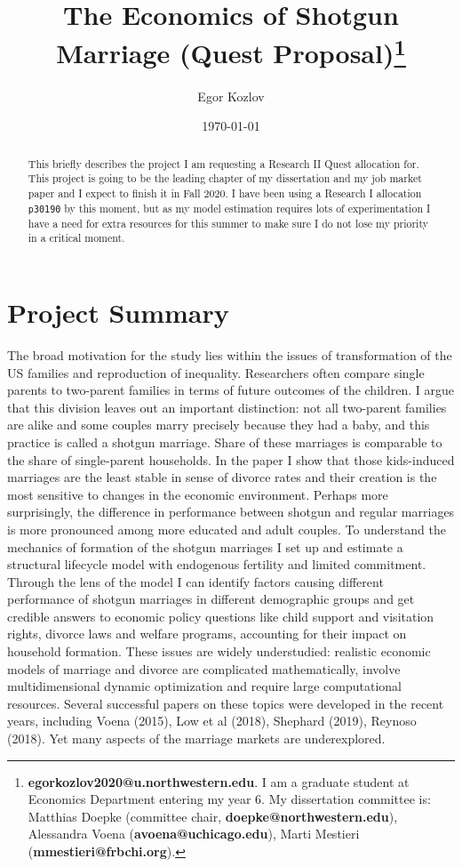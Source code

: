 \documentclass[11pt,letter]{article}
\begin{document}
\title{The Economics of Shotgun Marriage (Quest Proposal)\footnote{\textbf{egorkozlov2020@u.northwestern.edu}. I am a graduate student at Economics Department entering my year 6. My dissertation committee is: Matthias Doepke (committee chair, \textbf{doepke@northwestern.edu}), Alessandra Voena (\textbf{avoena@uchicago.edu}), Marti Mestieri (\textbf{mmestieri@frbchi.org}).}}
\author{Egor Kozlov}
\date{\today}
\maketitle



\begin{abstract}
This briefly describes the project I am requesting a Research II Quest allocation for. This project is going to be the leading chapter of my dissertation and my job market paper and I expect to finish it in Fall 2020. I have been using a Research I allocation \verb'p30190' by this moment, but as my model estimation requires lots of experimentation I have a need for extra resources for this summer to make sure I do not lose my priority in a critical moment.
\end{abstract}

\section{Project Summary}

The broad motivation for the study lies within the issues of transformation of the US families and reproduction of inequality. Researchers often compare single parents to two-parent families in terms of future outcomes of the children. I argue that this division leaves out an important distinction: not all two-parent families are alike and some couples marry precisely because they had a baby, and this practice is called a shotgun marriage. Share of these marriages is comparable to the share of single-parent households. In the paper I show that those kids-induced marriages are the least stable in sense of divorce rates and their creation is the most sensitive to changes in the economic environment. Perhaps more surprisingly, the difference in performance between shotgun and regular marriages is more pronounced among more educated and adult couples. To understand the mechanics of formation of the shotgun marriages I set up and estimate a structural lifecycle model with endogenous fertility and limited commitment. Through the lens of the model I can identify factors causing different performance of shotgun marriages in different demographic groups and get credible answers to economic policy questions like child support and visitation rights, divorce laws and welfare programs, accounting for their impact on household formation. These issues are widely understudied: realistic economic models of marriage and divorce are complicated mathematically, involve multidimensional dynamic optimization and require large computational resources.  Several successful papers on these topics were developed in the recent years, including \nocite{voena-1}Voena (2015), \nocite{low-1}Low et al (2018), \nocite{shephard}Shephard (2019), \nocite{reynoso}Reynoso (2018). Yet many aspects of the marriage markets are underexplored.
\end{document}
